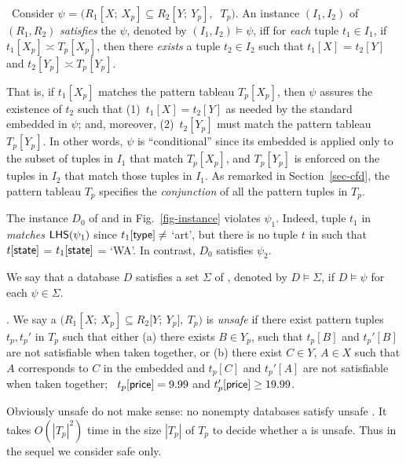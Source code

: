 ~Consider \pCIND $\psi$ =
$(R_1[X;\ X_p] \subseteq R_2[Y;\ Y_p],$ $\ T_p)$.
An instance  $(I_1, I_2)$ of $(R_1, R_2)$ {\em satisfies} the \pCIND
$\psi$, denoted by $(I_1, I_2) \models \psi$, iff for {\em each}
tuple $t_1\in I_1$, if $t_1[X_p] \asymp T_p[X_p]$, then there {\em
exists} a tuple $t_2\in I_2$ such that $t_1[X]$ = $t_2[Y]$ and $t_2[Y_p] \asymp T_p[Y_p]$.


That is, if $t_1[X_p]$ matches
the pattern tableau $T_p[X_p]$, then $\psi$ assures the
existence of $t_2$ such that (1)~$t_1[X] = t_2[Y]$ as
needed by the standard \IND embedded in $\psi$;
and, moreover, (2)~$t_2[Y_p]$
must match the pattern tableau $T_p[Y_p]$. In other words,
$\psi$ is ``conditional'' since its embedded \IND is applied only to the
subset of tuples in $I_1$ that match $T_p[X_p]$, and
$T_p[Y_p]$ is enforced on the tuples in $I_2$
that match those tuples in $I_1$. As remarked in Section~\ref{sec-cfd},
the pattern tableau $T_p$ specifies the {\em conjunction} of
all the pattern tuples in $T_p$.

\vspace{-0.5ex}
\begin{example}
The instance $D_0$ of  and  in
Fig.~\ref{fig-instance} violates \pCIND $\psi_1$. Indeed, tuple
$t_1$ in  {\em matches} ${\mathsf{LHS}}(\psi_1)$ since
$t_1[\protect\mathsf{type}] \ne $ `art', but there is no tuple $t$ in 
such that $t[\protect\mathsf{state}]$ = $t_1[\protect\mathsf{state}]$ = `WA'. In contrast,
$D_0$ satisfies $\psi_2$.
\end{example}


We say that a database
$D$ satisfies a set $\Sigma$ of \pCINDs, denoted by $D \models
\Sigma$, if $D \models \psi$ for each $\psi \in \Sigma$.


.
We say a \pCIND $(R_1[X;\ X_p] \subseteq R_2[Y;$$\ Y_p],\ T_p)$ is
{\em unsafe} if  there exist pattern tuples $t_p, t_p'$ in $T_p$
such that
either (a) there exists $B\in Y_p$, such that $t_p[B]$ and $t_p'[B]$
are not satisfiable when taken together,
or (b) there exist $C \in Y$, $A \in X$ such that $A$ corresponds to $C$ in the
embedded \IND and $t_p[C]$ and $t_p'[A]$ are not satisfiable
when taken together;
\eg~$t_p[\protect\mathsf{price}] = 9.99$ and $t_p'[\protect\mathsf{price}] \ge 19.99$.

Obviously unsafe \pCINDs do not make sense: no nonempty
databases satisfy unsafe \pCINDs. It takes $O(|T_p|^2)$ time
in the size $|T_p|$ of $T_p$ to decide whether a \pCIND is unsafe.
Thus in the sequel we consider safe \pCIND only.


